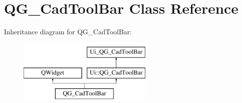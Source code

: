 \hypertarget{classQG__CadToolBar}{\section{Q\-G\-\_\-\-Cad\-Tool\-Bar Class Reference}
\label{classQG__CadToolBar}
}
Inheritance diagram for Q\-G\-\_\-\-Cad\-Tool\-Bar\-:\begin{figure}[H]
\begin{center}
\leavevmode
\includegraphics[height=3.000000cm]{classQG__CadToolBar}
\end{center}
\end{figure}
